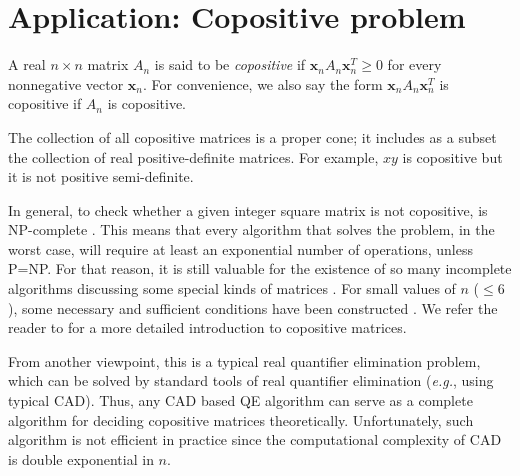 \documentclass[amsthm]{elsart}
\newcommand{\xx}{\bm{x}}
\begin{document}
\section{Application: Copositive problem}\label{sec:copositive}
\begin{defn}
A real $n\times n$ matrix $A_n$ is said to be {\em copositive} if $\xx_nA_n\xx_n^T\ge0$ for every nonnegative vector $\xx_n$. For convenience, we also say the form $\xx_nA_n\xx_n^T$ is copositive if $A_n$ is copositive.
\end{defn}
The collection of all copositive matrices is a proper cone; it includes as a subset the collection of real positive-definite matrices. For example, $xy$ is copositive but it is not positive semi-definite.

In general, to check whether a given integer square matrix is not copositive, is NP-complete \citep{murty1987some}.
This means that every algorithm that solves the problem, in the worst case, will require at least
an exponential number of operations, unless P=NP. For that reason, it is
still valuable for the existence of so many incomplete algorithms discussing
some special kinds of matrices \citep{parrilo2000structured}. For
small values of $n$ ($\le6$), some necessary and sufficient conditions have been
constructed \citep{hadeler1983copositive,andersson1995criteria}. We refer the reader to \citep{hiriart2010variational} for a more detailed introduction to copositive matrices.

From another viewpoint, this is a typical real quantifier elimination problem, which can be solved by standard tools of real quantifier elimination ({\it e.g.}, using typical CAD). Thus, any CAD based QE algorithm can serve as a complete algorithm for
deciding copositive matrices theoretically. Unfortunately, such algorithm is not efficient in practice since the computational complexity of CAD is double exponential in $n$. 
\end{document}
